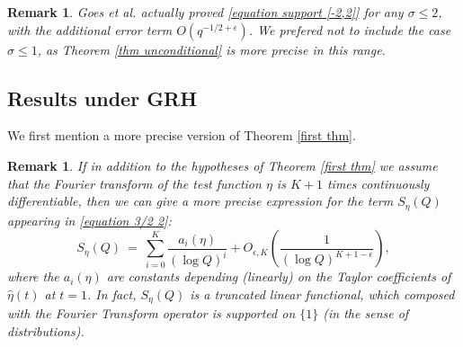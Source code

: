 \documentclass[12pt,reqno]{amsart}
\numberwithin{equation}{section}
\theoremstyle{plain}
\newtheorem{remark}[thm]{Remark}
\begin{document}
\begin{remark}
Goes et al. \cite{GJMMNPP} actually proved \eqref{equation support [-2,2]} for any $\sigma\leq 2$, with the additional error term $O(q^{-1/2+\epsilon})$. We prefered not to include the case $\sigma\leq 1$, as Theorem \ref{thm unconditional} is more precise in this range.
\end{remark}

\subsection{Results under GRH}\label{sec:resultsunderGRH}

We first mention a more precise version of Theorem \ref{first thm}.
\begin{remark}
\label{rmk:more precise first thm}
If in addition to the hypotheses of Theorem \ref{first thm} we assume that the Fourier transform of the test function $\eta$ is $K+1$ times continuously differentiable, then we can give a more precise expression for the term $S_{\eta}(Q)$ appearing in \eqref{equation 3/2 2}: \begin{equation} S_{\eta}(Q) \ =\ \sum_{i=0}^K \frac{a_i(\eta)}{(\log Q)^i} + O_{\epsilon,K}\left( \frac {1}{(\log Q)^{K+1-\epsilon}}\right), \end{equation} where the $a_i(\eta)$ are constants depending (linearly) on the Taylor coefficients of ${\widehat{\eta}}(t)$ at $t=1$. In fact, $S_{\eta}(Q)$ is a truncated linear functional, which composed with the Fourier Transform operator is supported on $\{1\}$ (in the sense of distributions).
\end{remark}
\end{document}

